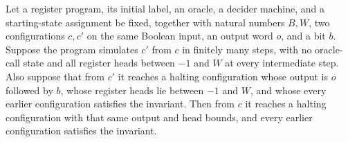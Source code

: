 \begin{lemma}
\label{Complexity.LogProg.inv_append}
\leanok
{}
Let a register program, its initial label, an oracle, a decider machine, and a
starting-state assignment be fixed, together with natural numbers $B,W$, two
configurations $c,c'$ on the same Boolean input, an output word $o$, and a bit $b$.
Suppose the program simulates $c'$ from $c$ in finitely many steps, with no oracle-call
state and all register heads between $-1$ and $W$ at every intermediate step. Also
suppose that from $c'$ it reaches a halting configuration whose output is $o$ followed
by $b$, whose register heads lie between $-1$ and $W$, and whose every earlier
configuration satisfies the invariant. Then from $c$ it reaches a halting configuration
with that same output and head bounds, and every earlier configuration satisfies the
invariant.
\end{lemma}

